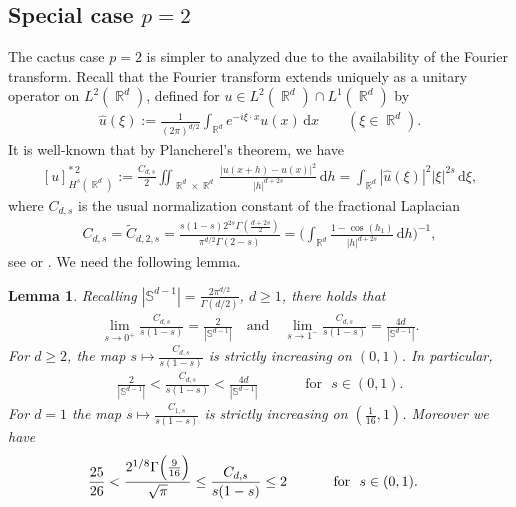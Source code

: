 \documentclass[12pt, reqno]{amsart}%
\theoremstyle{plain}  %
\newtheorem{lemma}[theorem]{Lemma}
\theoremstyle{definition}  %
\theoremstyle{remark}
\numberwithin{equation}{section}
\DeclareMathOperator{\R}{\mathbb{R}}
\renewcommand{\d}{\,\mathrm{d}}
\begin{document}
\subsection{Special case $p=2$}
The cactus case $p = 2$ is simpler to analyzed due to the availability of the Fourier transform.
Recall that the Fourier transform extends uniquely as a unitary operator on $L^2(\R^d)$, defined for
$u \in L^2(\R^d) \cap L^1(\R^d)$ by
\begin{align*}
\hat{u}(\xi):= \frac{1}{(2\pi)^{d/2}}\int_{\R^d} e^{-i\xi\cdot x} u(x)\d x\qquad (\xi\in \R^d).
\end{align*}
It is well-known that by Plancherel's theorem, we have
\begin{align}\label{eq:xxplancherel}
[u]^{*\, 2}_{H^s(\R^d)}:=\frac{ C_{d,s}}{2}\iint_{\R^d \times \R^d}\frac{|u(x+h)-u(x)|^2}{|h |^{d+2s}}\d h= \int_{\R^d}|\hat{u}(\xi)|^2|\xi|^{2s}\d \xi,
\end{align}
where $C_{d,s}$ is the usual normalization constant of the fractional Laplacian
\begin{align*}
C_{d,s}
= \widetilde{C}_{d,2,s}
= \frac{s (1-s) 2^{2s} \Gamma\left( \frac{d + 2s}{2} \right)}{\pi^{d/2} \Gamma(2 - s)}=\Big(\int_{\R^d}\frac{1-\cos(h_1)}{|h|^{d+2s}}\d h\Big)^{-1},
\end{align*}
see \cite[Section 2.3]{guy-thesis} or \cite[Chapter 1]{BuVa16}.
We need the following lemma.
\begin{lemma}
\label{lem:bounds-renorm-fract-cst} Recalling  $|\mathbb{S}^{d-1}|=\frac{2\pi^{d/2}}{\Gamma(d/2)}$, $d\geq1$, there holds that
\begin{align*}
\lim_{s \to 0^+} \frac{C_{d,s}}{s(1 - s)} =
\frac{2}{|\mathbb{S}^{d-1}|}\quad\text{and}\quad
\lim_{s \to 1^-} \frac{C_{d,s}}{s(1 - s)} = \frac{4d}{|\mathbb{S}^{d-1}|}.
\end{align*}
For $d\geq 2$, the map $s\mapsto \frac{C_{d,s}}{s(1-s)} $ is strictly increasing on $(0,1)$. In particular,
\begin{align*}
 \frac{2}{|\mathbb{S}^{d-1}|} < \frac{C_{d,s}}{s(1-s)}  < \frac{4d}{|\mathbb{S}^{d-1}|}\qquad \quad  \text{ for } \,\,  s\in(0,1).
\end{align*}
For $d=1$  the map $s\mapsto \frac{C_{1,s}}{s(1-s)} $ is strictly increasing on $(\tfrac{1}{16},1)$.  Moreover we have
\begin{align*}
\frac{25}{26}
&<\frac{2^{1/8}\Gamma\Big(\frac{9}{16}\Big)}{\sqrt{\pi}} \leq \frac{C_{d,s}}{s(1-s)} \leq2\quad \qquad \text{ for\,\,  $s\in (0,1)$}.
 \end{align*}
\end{lemma}
\end{document}
